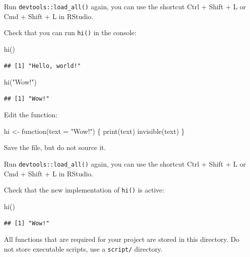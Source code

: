 \documentclass[]{book}
\newenvironment{Shaded}{}{}
\newcommand{\ControlFlowTok}[1]{\textcolor[rgb]{0.00,0.00,1.00}{#1}}
\newcommand{\DataTypeTok}[1]{#1}
\newcommand{\KeywordTok}[1]{\textcolor[rgb]{0.00,0.00,1.00}{#1}}
\newcommand{\NormalTok}[1]{#1}
\newcommand{\StringTok}[1]{\textcolor[rgb]{0.00,0.50,0.50}{#1}}
\begin{document}
Run \texttt{devtools::load\_all()} again, you can use the shortcut Ctrl + Shift + L or Cmd + Shift + L in RStudio.

Check that you can run \texttt{hi()} in the console:

\begin{Shaded}
\begin{Highlighting}[]
\KeywordTok{hi}\NormalTok{()}
\end{Highlighting}
\end{Shaded}

\begin{verbatim}
## [1] "Hello, world!"
\end{verbatim}

\begin{Shaded}
\begin{Highlighting}[]
\KeywordTok{hi}\NormalTok{(}\StringTok{"Wow!"}\NormalTok{)}
\end{Highlighting}
\end{Shaded}

\begin{verbatim}
## [1] "Wow!"
\end{verbatim}

Edit the function:

\begin{Shaded}
\begin{Highlighting}[]
\NormalTok{hi <-}\StringTok{ }\ControlFlowTok{function}\NormalTok{(}\DataTypeTok{text =} \StringTok{"Wow!"}\NormalTok{) \{}
  \KeywordTok{print}\NormalTok{(text)}
  \KeywordTok{invisible}\NormalTok{(text)}
\NormalTok{\}}
\end{Highlighting}
\end{Shaded}

Save the file, but do not source it.

Run \texttt{devtools::load\_all()} again, you can use the shortcut Ctrl + Shift + L or Cmd + Shift + L in RStudio.

Check that the new implementation of \texttt{hi()} is active:

\begin{Shaded}
\begin{Highlighting}[]
\KeywordTok{hi}\NormalTok{()}
\end{Highlighting}
\end{Shaded}

\begin{verbatim}
## [1] "Wow!"
\end{verbatim}

All functions that are required for your project are stored in this directory.
Do not store executable scripts, use a \texttt{script/} directory.
\end{document}
